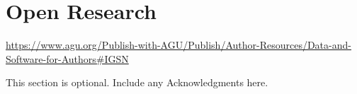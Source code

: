 \documentclass[draft]{agujournal2019}
\begin{document}
\section{Open Research}

\url{https://www.agu.org/Publish-with-AGU/Publish/Author-Resources/Data-and-Software-for-Authors#IGSN}

\acknowledgments
This section is optional. Include any Acknowledgments here.


%
%




%
%
\end{document}
